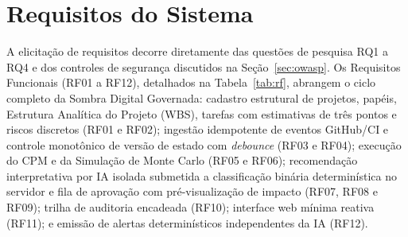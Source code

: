 \documentclass[12pt,openany,oneside,a4paper,english,brazilian,sumario=tradicional]{abntex2}
\begin{document}
\section{Requisitos do Sistema}\label{sec:requisitos}

A elicitação de requisitos decorre diretamente das questões de pesquisa RQ1 a RQ4 e dos controles de segurança discutidos na Seção~\ref{sec:owasp}. Os Requisitos Funcionais (RF01 a RF12), detalhados na Tabela~\ref{tab:rf}, abrangem o ciclo completo da Sombra Digital Governada: cadastro estrutural de projetos, papéis, Estrutura Analítica do Projeto (WBS), tarefas com estimativas de três pontos e riscos discretos (RF01 e RF02); ingestão idempotente de eventos GitHub/CI e controle monotônico de versão de estado com \textit{debounce} (RF03 e RF04); execução do CPM e da Simulação de Monte Carlo (RF05 e RF06); recomendação interpretativa por IA isolada submetida a classificação binária determinística no servidor e fila de aprovação com pré-visualização de impacto (RF07, RF08 e RF09); trilha de auditoria encadeada (RF10); interface web mínima reativa (RF11); e emissão de alertas determinísticos independentes da IA (RF12).
\end{document}
